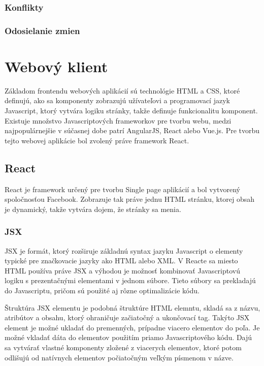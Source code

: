 \documentclass[
  digital, %
  table,   %
  lof,     %
  lot,     %
]{fithesis3}
\begin{document}
\subsection{Konflikty}

\subsection{Odosielanie zmien}






\chapter{Webový klient}
Základom frontendu webových aplikácií sú technológie HTML a CSS, ktoré definujú, ako sa komponenty zobrazujú užívateľovi a programovací jazyk Javascript, ktorý vytvára logiku stránky, takže definuje funkcionalitu komponent. Existuje množstvo Javascriptových frameworkov pre tvorbu webu, medzi najpopulárnejšie v súčasnej dobe patrí AngularJS, React alebo Vue.js. Pre tvorbu tejto webovej aplikácie bol zvolený práve framework React.

\section{React}
React je framework určený pre tvorbu Single page aplikácií a bol vytvorený spoločnosťou Facebook. Zobrazuje tak práve jednu HTML stránku, ktorej obsah je dynamický, takže vytvára dojem, že stránky sa menia.

\subsection{JSX}
JSX je formát, ktorý rozširuje základnú syntax jazyku Javascript o elementy typické pre značkovacie jazyky ako HTML alebo XML. V Reacte sa miesto HTML používa práve JSX a výhodou je možnosť kombinovať Javascriptovú logiku s prezentačnými elementami v jednom súbore. Tieto súbory sa prekladajú do Javascriptu, pričom sú použité aj rôzne optimalizácie kódu.

Štruktúra JSX elementu je podobná štruktúre HTML elemntu, skladá sa z názvu, atribútov a obsahu, ktorý ohraničuje začiatočný a ukončovací tag. Takýto JSX element je možné ukladať do premenných, prípadne viacero elementov do poľa. Je možné vkladať dáta do elementov použitím priamo Javascriptového kódu. Dajú sa vytvárať vlastné komponenty zložené z viacerych elementov, ktoré potom odlišujú od natívnych elementov počiatočným veľkým písmenom v názve.
\end{document}

